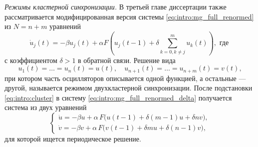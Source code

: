 %
%

\textit{Режимы кластерной синхронизации.} 
В третьей главе диссертации также рассматривается модифицированная версия системы \eqref{eq:intro:mg_full_renormed} из $N = n + m$ уравнений
\begin{equation}
	\label{eq:intro:mg_full_renormed_delta}
	\dot{u}_j(t) = -\beta u_j(t) + \alpha F \left(u_j(t - 1) + \delta\sum\limits_{k = 0, k\neq j}^m u_k(t)\right), \text{ где }
\end{equation}
с коэффициентом $\delta > 1$ в обратной связи. Решение вида 
\begin{equation}
	\label{eq:intro:cluster}
	u_1(t)=\ldots=u_n(t) = u(t),\quad u_{n+1}(t)=\ldots=u_{n+m}(t) = v(t),
\end{equation}
при котором часть осцилляторов описывается одной функцией, а остальные --- другой, называется режимом двухкластерной синхронизации. После подстановки \eqref{eq:intro:cluster} в систему \eqref{eq:intro:mg_full_renormed_delta} получается система из двух уравнений
%
\begin{equation}
	\label{eq:intro:system_uv}
	\begin{cases}
		\dot{u} = -\beta u + \alpha \, F \big(u(t - 1) + \delta (m - 1) u + \delta n v\big),\\
		\dot{v} = -\beta v + \alpha \, F \big(v(t - 1) + \delta m u + \delta (n - 1) v\big),
	\end{cases}
\end{equation}
%
для которой ищется периодическое решение.

